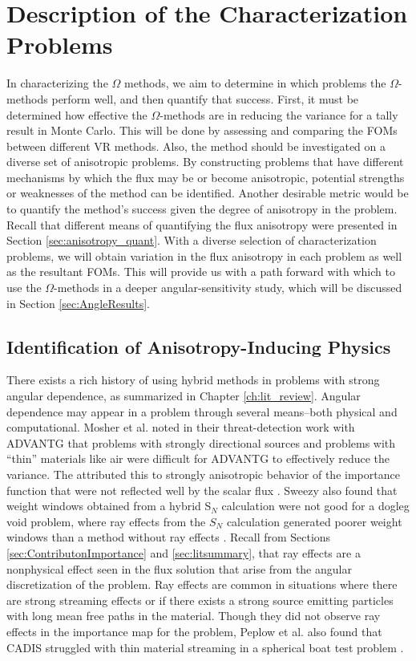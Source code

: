 \section{Description of the Characterization Problems}
\label{sec:AngleProbDesc}

In characterizing the $\Omega$ methods, we aim to determine in which problems
the $\Omega$-methods perform well, and then quantify that success.
First, it must be determined how effective the
$\Omega$-methods are in reducing the variance for a tally result in Monte Carlo.
This will be done by assessing and comparing the FOMs between different VR methods.
Also, the method should be investigated on a diverse set of anisotropic
problems. By constructing problems that have
different mechanisms by which the flux may be or become
anisotropic, potential strengths or weaknesses of the method can be identified.
Another desirable metric would be to quantify the method's success given the
degree of anisotropy in the problem. Recall that different
means of quantifying the flux
anisotropy were presented in Section \ref{sec:anisotropy_quant}. With a diverse
selection of characterization problems, we will obtain variation in the flux
anisotropy in each problem as well as the resultant FOMs. This will provide us
with a path forward with which to use the $\Omega$-methods in a deeper
angular-sensitivity study, which will be discussed in Section
\ref{sec:AngleResults}.

\subsection{Identification of Anisotropy-Inducing Physics}
\label{subsec:AngleProbID}

There exists a rich history of using hybrid methods in problems with strong
angular dependence, as summarized in Chapter \ref{ch:lit_review}. Angular
dependence may appear in a problem through several means--both physical and
computational.
Mosher et al. noted in their threat-detection work with ADVANTG
that problems with strongly directional sources and
problems with ``thin'' materials like air were difficult for ADVANTG to effectively
reduce the variance. The attributed this to strongly anisotropic behavior of the
importance function that were not reflected well by the scalar flux
\cite{mosher_automated_2009}. Sweezy also found that weight windows obtained
from a hybrid S$_N$ calculation were not good for a dogleg void problem,
where ray effects from the $S_N$ calculation generated poorer weight windows
than a method without ray effects \cite{sweezy_automated_2005}. Recall from
Sections \ref{sec:ContributonImportance} and \ref{sec:litsummary}, that ray
effects are a nonphysical effect seen in the flux solution that arise from
the angular discretization of the problem.
Ray effects are common in situations where there are strong
streaming effects or if there exists a strong source emitting particles with
long mean free paths in the material. Though they did not observe ray effects in
the importance map for the problem, Peplow et
al. also found that CADIS struggled with thin material streaming in a spherical
boat test problem \cite{peplow_consistent_2012}.

